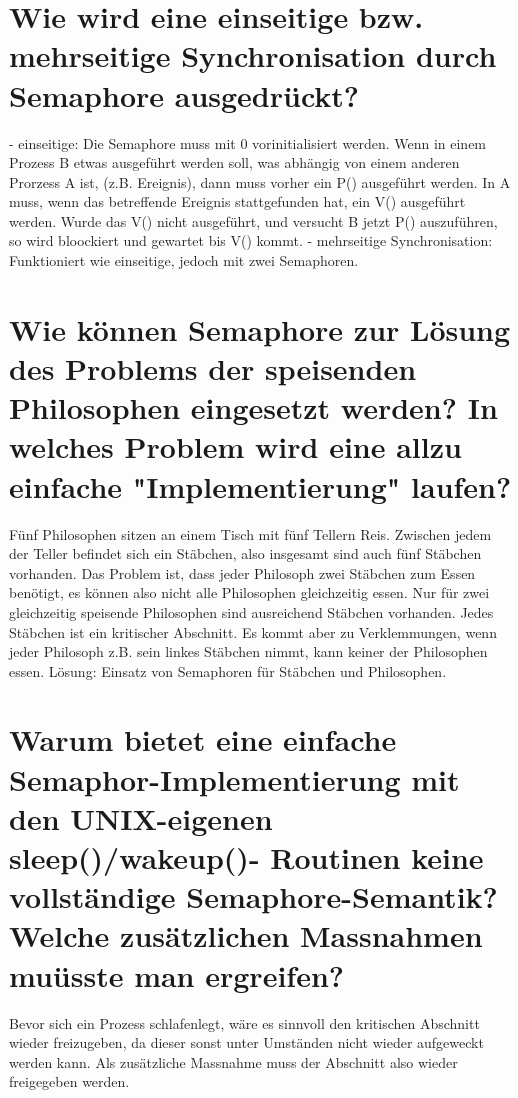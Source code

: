 \documentclass[12pt,a4paper,ngerman]{scrartcl}
\newcommand{\question}[1]{#1}
\newenvironment {answer}
                {}
                {}
\begin{document}
\section{\question{Wie wird eine einseitige bzw. mehrseitige Synchronisation durch Semaphore ausgedrückt?}}
\begin{answer}
- einseitige: Die Semaphore muss mit 0 vorinitialisiert werden. Wenn in einem Prozess B etwas
ausgeführt werden soll, was abhängig von einem anderen Prorzess A ist, (z.B. Ereignis), dann muss
vorher ein P() ausgeführt werden. In A muss, wenn das betreffende Ereignis stattgefunden hat, ein
V() ausgeführt werden. Wurde das V() nicht ausgeführt, und versucht B jetzt P() auszuführen,
so wird bloockiert und gewartet bis V() kommt.
- mehrseitige Synchronisation: Funktioniert wie einseitige, jedoch mit zwei Semaphoren.
\end{answer}

\section{\question{Wie können Semaphore zur Lösung des Problems der speisenden Philosophen eingesetzt werden? In welches Problem wird eine allzu einfache "Implementierung" laufen?}}
\begin{answer}
Fünf Philosophen sitzen an einem Tisch mit fünf Tellern Reis. Zwischen jedem der Teller befindet
sich ein Stäbchen, also insgesamt sind auch fünf Stäbchen vorhanden. Das Problem ist, dass jeder
Philosoph zwei Stäbchen zum Essen benötigt, es können also nicht alle Philosophen gleichzeitig
essen. Nur für zwei gleichzeitig speisende Philosophen sind ausreichend Stäbchen vorhanden.
Jedes Stäbchen ist ein kritischer Abschnitt. Es kommt aber zu Verklemmungen, wenn jeder Philosoph
z.B. sein linkes Stäbchen nimmt, kann keiner der Philosophen essen.
Lösung: Einsatz von Semaphoren für Stäbchen und Philosophen.
\end{answer}

\section{\question{Warum bietet eine einfache Semaphor-Implementierung mit den UNIX-eigenen sleep()/wakeup()-
Routinen keine vollständige Semaphore-Semantik?Welche zusätzlichen Massnahmen muüsste man
ergreifen?}}
\begin{answer}
Bevor sich ein Prozess schlafenlegt, wäre es sinnvoll den kritischen Abschnitt wieder freizugeben,
da dieser sonst unter Umständen nicht wieder aufgeweckt werden kann. Als zusätzliche Massnahme
muss der Abschnitt also wieder freigegeben werden.
\end{answer}
\end{document}
